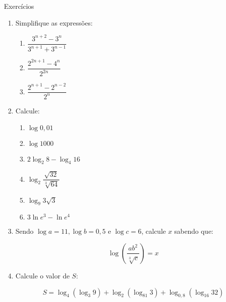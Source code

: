 \documentclass[14pt, aspectratio=169]{beamer}
\newcommand{\skipframe}{\vspace{10.0cm}}
\newcommand{\parenthesis}[1]{\left( #1 \right)}
\begin{document}
\begin{frame}[allowframebreaks]{Exercícios}
\begin{enumerate}
        \skipframe

        \item Simplifique as expressões:

        \begin{multicols}{3}
            \begin{enumerate}[a]
                \item $\dfrac{3^{n+2} - 3^n}{3^{n+1} + 3^{n-1}}$
                \item $\dfrac{2^{2n + 1} - 4^n}{2^{2n}}$
                \item $\dfrac{2^{n + 1} - 2^{n-2}}{2^n}$
            \end{enumerate}
        \end{multicols}

        \skipframe

        \item Calcule:

        \begin{multicols}{2}
            \begin{enumerate}[a]
                \item $\log 0,01$
                \item $\log 1000$
                \item $2 \log_2 8 - \log_4 16$
                \item $\log_2 \dfrac{\sqrt{32}}{\sqrt[3]{64}}$
                \item $\log_9 3 \sqrt{3}$
                \item $3 \ln e^3 - \ln e^4$
            \end{enumerate}
        \end{multicols}

        \skipframe

        \item Sendo $\log a = 11, \log b = 0,5$ e $\log c = 6$, calcule $x$ sabendo que:
        
        \begin{equation*}
            \log \parenthesis{\dfrac{ab^2}{\sqrt[3]{c}}} = x
        \end{equation*}

        \skipframe

        \item \cite{fme02} Calcule o valor de $S$:

        \begin{equation*}
            S = \log_4 \parenthesis{\log_3 9} + \log_2 \parenthesis{\log_{81} 3} + \log_{0,8} \parenthesis{\log_{16} 32}
        \end{equation*}


\end{enumerate}
\end{frame}
\end{document}

